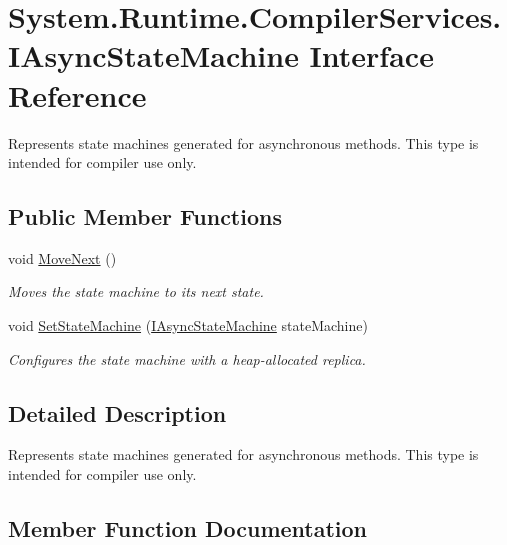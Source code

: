 \hypertarget{interface_system_1_1_runtime_1_1_compiler_services_1_1_i_async_state_machine}{}\section{System.\+Runtime.\+Compiler\+Services.\+I\+Async\+State\+Machine Interface Reference}
\label{interface_system_1_1_runtime_1_1_compiler_services_1_1_i_async_state_machine}


Represents state machines generated for asynchronous methods. This type is intended for compiler use only.  


\subsection*{Public Member Functions}
\begin{DoxyCompactItemize}
\item 
void \hyperlink{interface_system_1_1_runtime_1_1_compiler_services_1_1_i_async_state_machine_a38f019e5301615a0f2182aca31d58a20}{Move\+Next} ()
\begin{DoxyCompactList}\small\item\em Moves the state machine to its next state.\end{DoxyCompactList}\item 
void \hyperlink{interface_system_1_1_runtime_1_1_compiler_services_1_1_i_async_state_machine_a87166a864f9bfc0add0adae96127b8c0}{Set\+State\+Machine} (\hyperlink{interface_system_1_1_runtime_1_1_compiler_services_1_1_i_async_state_machine}{I\+Async\+State\+Machine} state\+Machine)
\begin{DoxyCompactList}\small\item\em Configures the state machine with a heap-\/allocated replica.\end{DoxyCompactList}\end{DoxyCompactItemize}


\subsection{Detailed Description}
Represents state machines generated for asynchronous methods. This type is intended for compiler use only. 



\subsection{Member Function Documentation}
\mbox{\label{interface_system_1_1_runtime_1_1_compiler_services_1_1_i_async_state_machine_a38f019e5301615a0f2182aca31d58a20}} 
